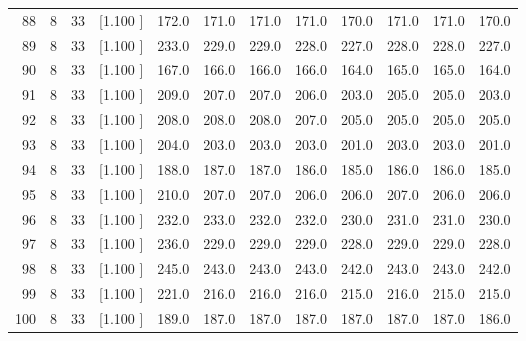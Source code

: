 \documentclass[12pt,a4paper]{article}
\begin{document}
\begin{center}
{\begin{tabular}{r r r r r r r r r r r r}
  88&  8& 33&[1.100     ]&   172.0&   171.0&   171.0&   171.0&   170.0&   171.0&   171.0&   170.0\\[-0.02in]
  89&  8& 33&[1.100     ]&   233.0&   229.0&   229.0&   228.0&   227.0&   228.0&   228.0&   227.0\\[-0.02in]
  90&  8& 33&[1.100     ]&   167.0&   166.0&   166.0&   166.0&   164.0&   165.0&   165.0&   164.0\\[-0.02in]
  91&  8& 33&[1.100     ]&   209.0&   207.0&   207.0&   206.0&   203.0&   205.0&   205.0&   203.0\\[-0.02in]
  92&  8& 33&[1.100     ]&   208.0&   208.0&   208.0&   207.0&   205.0&   205.0&   205.0&   205.0\\[-0.02in]
  93&  8& 33&[1.100     ]&   204.0&   203.0&   203.0&   203.0&   201.0&   203.0&   203.0&   201.0\\[-0.02in]
  94&  8& 33&[1.100     ]&   188.0&   187.0&   187.0&   186.0&   185.0&   186.0&   186.0&   185.0\\[-0.02in]
  95&  8& 33&[1.100     ]&   210.0&   207.0&   207.0&   206.0&   206.0&   207.0&   206.0&   206.0\\[-0.02in]
  96&  8& 33&[1.100     ]&   232.0&   233.0&   232.0&   232.0&   230.0&   231.0&   231.0&   230.0\\[-0.02in]
  97&  8& 33&[1.100     ]&   236.0&   229.0&   229.0&   229.0&   228.0&   229.0&   229.0&   228.0\\[-0.02in]
  98&  8& 33&[1.100     ]&   245.0&   243.0&   243.0&   243.0&   242.0&   243.0&   243.0&   242.0\\[-0.02in]
  99&  8& 33&[1.100     ]&   221.0&   216.0&   216.0&   216.0&   215.0&   216.0&   215.0&   215.0\\[-0.02in]
 100&  8& 33&[1.100     ]&   189.0&   187.0&   187.0&   187.0&   187.0&   187.0&   187.0&   186.0\\[-0.02in]

\hline
\end{tabular}}
\end{center}
\end{document}
